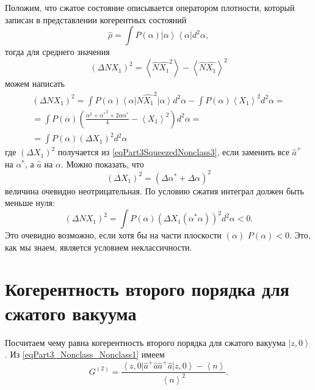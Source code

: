 Положим, что сжатое состояние описывается оператором плотности,
который записан в представлении когерентных состояний
\[
\hat{\rho} = \int P\left(\alpha\right)
\left|\alpha\right>
\left<\alpha\right| d^2 \alpha,
\]
тогда для среднего значения 
\begin{equation}
\left(\Delta N X_1\right)^2 = 
\left<\hat{N} \hat{X_1}^2\right> - \left<\hat{N} \hat{X_1}\right>^2 
\label{eqPart3SqueezedNonclass3}
\end{equation}
можем написать
\begin{eqnarray}
  \left(\Delta N X_1\right)^2 =
  \int P\left(\alpha\right)
  \left<\alpha\right|
  \hat{N} \hat{X_1}^2
  \left|\alpha\right> d^2 \alpha -
  \int P\left(\alpha\right)
  \left< X_1 \right>^2
  d^2 \alpha
  =
  \nonumber \\
  =
  \int  
  P\left(\alpha\right)
  \left(
  \frac{
    \alpha^2 + {\alpha^\ast}^2 +
    2 \alpha \alpha^\ast}{4}
  - \left< X_1 \right>^2
  \right)
   d^2 \alpha
  =
  \nonumber \\
  =
 \int 
P\left(\alpha\right)
\left(\Delta X_1\right)^2
d^2 \alpha
\end{eqnarray}
где $\left(\Delta X_1\right)^2$ получается из
\eqref{eqPart3SqueezedNonclass3}, если заменить все $\hat{a}^{+}$ на
$\alpha^{*}$, а $\hat{a}$ на $\alpha$. Можно показать, что
\[
\left(\Delta X_1\right)^2 = \left(\Delta \alpha^{*} + \Delta \alpha\right)^2
\]
величина очевидно неотрицательная. По условию сжатия интеграл должен
быть меньше нуля:
\begin{equation}
\left(\Delta N X_1\right)^2 = 
 \int 
P\left(\alpha\right)
\left(\Delta X_1\left(\alpha^{*}\alpha\right)\right)^2
d^2 \alpha < 0.
\nonumber
\end{equation}
Это очевидно возможно, если хотя бы на части плоскости
$\left(\alpha\right)$ $P\left(\alpha\right) < 0$. Это, как мы знаем,
является условием неклассичности. 

\section{Когерентность второго порядка для сжатого вакуума}

Посчитаем чему равна когерентность второго порядка для сжатого вакуума
$\left|z, 0\right>$. Из \eqref{eqPart3_Nonclass_Nonclass1} имеем
\[
G^{(2)} = \frac{\left<z,0\right|\hat{a}^{+}\hat{a}\hat{a}^{+}\hat{a}\left|z,0\right>
- \left<n\right>}{\left<n\right>^2}.
\]

